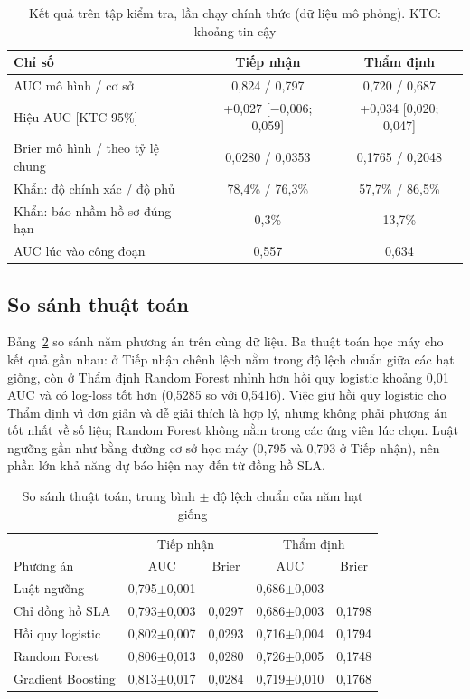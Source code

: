 \documentclass[journal]{IEEEtran}
\begin{document}
\begin{table}[t]
\caption{Kết quả trên tập kiểm tra, lần chạy chính thức (dữ liệu mô phỏng). KTC: khoảng tin cậy}
\label{tab:result}
\centering
\begin{tabular}{|l|c|c|}
\hline
Chỉ số & Tiếp nhận & Thẩm định \\
\hline
AUC mô hình / cơ sở & 0,824 / 0,797 & 0,720 / 0,687 \\
Hiệu AUC [KTC 95\%] & +0,027 [$-$0,006; 0,059] & +0,034 [0,020; 0,047] \\
Brier mô hình / theo tỷ lệ chung & 0,0280 / 0,0353 & 0,1765 / 0,2048 \\
Khẩn: độ chính xác / độ phủ & 78,4\% / 76,3\% & 57,7\% / 86,5\% \\
Khẩn: báo nhầm hồ sơ đúng hạn & 0,3\% & 13,7\% \\
AUC lúc vào công đoạn & 0,557 & 0,634 \\
\hline
\end{tabular}
\end{table}

\subsection{So sánh thuật toán}
Bảng~\ref{tab:algo} so sánh năm phương án trên cùng dữ liệu. Ba thuật toán học máy cho kết quả gần nhau: ở Tiếp nhận chênh lệch nằm trong độ lệch chuẩn giữa các hạt giống, còn ở Thẩm định Random Forest nhỉnh hơn hồi quy logistic khoảng 0,01 AUC và có log-loss tốt hơn (0,5285 so với 0,5416). Việc giữ hồi quy logistic cho Thẩm định vì đơn giản và dễ giải thích là hợp lý, nhưng không phải phương án tốt nhất về số liệu; Random Forest không nằm trong các ứng viên lúc chọn. Luật ngưỡng gần như bằng đường cơ sở học máy (0,795 và 0,793 ở Tiếp nhận), nên phần lớn khả năng dự báo hiện nay đến từ đồng hồ SLA.

\begin{table}[t]
\caption{So sánh thuật toán, trung bình $\pm$ độ lệch chuẩn của năm hạt giống}
\label{tab:algo}
\centering
\small
\begin{tabular}{|l|c|c|c|c|}
\hline
 & \multicolumn{2}{c|}{Tiếp nhận} & \multicolumn{2}{c|}{Thẩm định} \\
Phương án & AUC & Brier & AUC & Brier \\
\hline
Luật ngưỡng & 0,795$\pm$0,001 & --- & 0,686$\pm$0,003 & --- \\
Chỉ đồng hồ SLA & 0,793$\pm$0,003 & 0,0297 & 0,686$\pm$0,003 & 0,1798 \\
Hồi quy logistic & 0,802$\pm$0,007 & 0,0293 & 0,716$\pm$0,004 & 0,1794 \\
Random Forest & 0,806$\pm$0,013 & 0,0280 & 0,726$\pm$0,005 & 0,1748 \\
Gradient Boosting & 0,813$\pm$0,017 & 0,0284 & 0,719$\pm$0,010 & 0,1768 \\
\hline
\end{tabular}
\end{table}
\end{document}
